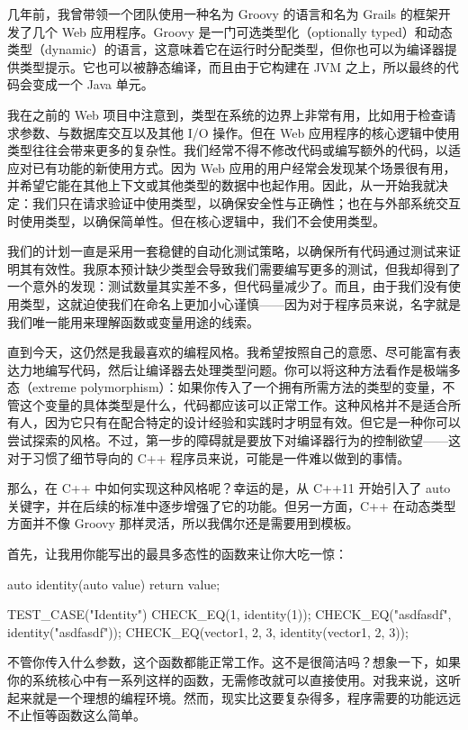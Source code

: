 
几年前，我曾带领一个团队使用一种名为 Groovy 的语言和名为 Grails 的框架开发了几个 Web 应用程序。Groovy 是一门可选类型化（optionally typed）和动态类型（dynamic）的语言，这意味着它在运行时分配类型，但你也可以为编译器提供类型提示。它也可以被静态编译，而且由于它构建在 JVM 之上，所以最终的代码会变成一个 Java 单元。

我在之前的 Web 项目中注意到，类型在系统的边界上非常有用，比如用于检查请求参数、与数据库交互以及其他 I/O 操作。但在 Web 应用程序的核心逻辑中使用类型往往会带来更多的复杂性。我们经常不得不修改代码或编写额外的代码，以适应对已有功能的新使用方式。因为 Web 应用的用户经常会发现某个场景很有用，并希望它能在其他上下文或其他类型的数据中也起作用。因此，从一开始我就决定：我们只在请求验证中使用类型，以确保安全性与正确性；也在与外部系统交互时使用类型，以确保简单性。但在核心逻辑中，我们不会使用类型。

我们的计划一直是采用一套稳健的自动化测试策略，以确保所有代码通过测试来证明其有效性。我原本预计缺少类型会导致我们需要编写更多的测试，但我却得到了一个意外的发现：测试数量其实差不多，但代码量减少了。而且，由于我们没有使用类型，这就迫使我们在命名上更加小心谨慎——因为对于程序员来说，名字就是我们唯一能用来理解函数或变量用途的线索。

直到今天，这仍然是我最喜欢的编程风格。我希望按照自己的意愿、尽可能富有表达力地编写代码，然后让编译器去处理类型问题。你可以将这种方法看作是极端多态（extreme polymorphism）：如果你传入了一个拥有所需方法的类型的变量，不管这个变量的具体类型是什么，代码都应该可以正常工作。这种风格并不是适合所有人，因为它只有在配合特定的设计经验和实践时才明显有效。但它是一种你可以尝试探索的风格。不过，第一步的障碍就是要放下对编译器行为的控制欲望——这对于习惯了细节导向的 C++ 程序员来说，可能是一件难以做到的事情。

那么，在 C++ 中如何实现这种风格呢？幸运的是，从 C++11 开始引入了 auto 关键字，并在后续的标准中逐步增强了它的功能。但另一方面，C++ 在动态类型方面并不像 Groovy 那样灵活，所以我偶尔还是需要用到模板。

首先，让我用你能写出的最具多态性的函数来让你大吃一惊：

\begin{cpp}
auto identity(auto value){ return value;}

TEST_CASE("Identity"){
  CHECK_EQ(1, identity(1));
  CHECK_EQ("asdfasdf", identity("asdfasdf"));
  CHECK_EQ(vector{1, 2, 3}, identity(vector{1, 2, 3}));
}
\end{cpp}

不管你传入什么参数，这个函数都能正常工作。这不是很简洁吗？想象一下，如果你的系统核心中有一系列这样的函数，无需修改就可以直接使用。对我来说，这听起来就是一个理想的编程环境。然而，现实比这要复杂得多，程序需要的功能远远不止恒等函数这么简单。

